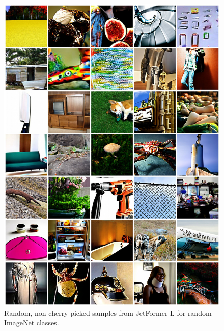 \documentclass{article} %
\newcommand{\name}{JetFormer\xspace}
\begin{document}
\begin{figure}[h]
    \centering
    \includegraphics[width=1.0\textwidth]{figures/random-samples-full.jpg}
    \caption{Random, non-cherry picked samples from \name-L for random ImageNet classes.}
\end{figure}
\end{document}
